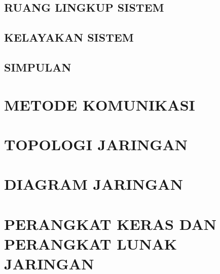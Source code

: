 \documentclass[pdftex,12pt, oneside]{article}
\begin{document}
\subsection{RUANG LINGKUP SISTEM}

\subsection{KELAYAKAN SISTEM}

\subsection{SIMPULAN}

\section{METODE KOMUNIKASI}

\section{TOPOLOGI JARINGAN}

\section{DIAGRAM JARINGAN}

\section{PERANGKAT KERAS DAN PERANGKAT LUNAK JARINGAN}
\end{document}
